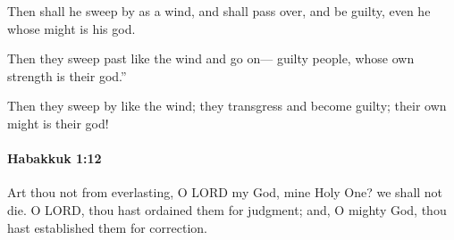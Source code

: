 			\begin{versebox}
					\item[BHS] 
					\item[LXX] 
					\item[ASV] Then shall he sweep by as a wind, and shall pass over, and be guilty, even he whose might is his god.
					\item[NIV] Then they sweep past like the wind and go on— guilty people, whose own strength is their god.”
					\item[NRSV] Then they sweep by like the wind; they transgress and become guilty; their own might is their god!
			\end{versebox}

		\paragraph{Habakkuk 1:12} %
			\label{HABAKKUK-1-12}

			Art thou not from everlasting, O LORD my God, mine Holy One? we shall not die. O LORD, thou hast ordained them for judgment; and, O mighty God, thou hast established them for correction.

